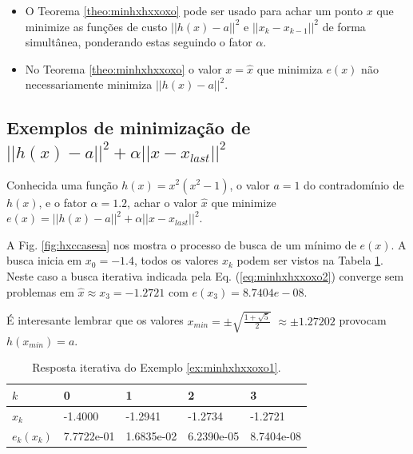 \begin{tcbattention}
\begin{itemize}
\item O Teorema \ref{theo:minhxhxxoxo} pode ser usado para achar um ponto $x$
que minimize as funções de custo $||h(x)-a||^2$ e
 $||x_{k}-x_{k-1}||^2$ de forma simultânea, ponderando estas seguindo o fator $\alpha$.
\item No Teorema \ref{theo:minhxhxxoxo} o valor $x=\hat{x}$ 
que minimiza $e(x)$ não necessariamente minimiza $||h(x)-a||^2$.
\end{itemize}
\end{tcbattention}
\subsection{Exemplos de minimização de $||h(x)-a||^2+\alpha ||x-x_{last}||^2$}


\begin{example}\label{ex:minhxhxxoxo1}
Conhecida uma função $h(x)=x^2(x^2-1)$, o valor $a=1$ do contradomínio de $h(x)$,
e o fator $\alpha=1.2$,
achar o valor $\hat{x}$ que minimize $e(x)=||h(x)-a||^2+\alpha||x-x_{last}||^2$.
\end{example}
\begin{SolutionT}\label{sol:minhxhxxoxo1}
 A Fig. \ref{fig:hxccasesa} nos mostra o processo de busca de um mínimo
 de $e(x)$. A busca inicia em $x_0=-1.4$,
 todos os valores $x_{k}$ podem ser vistos na Tabela \ref{tab:hxccases1}. 
Neste caso a busca iterativa indicada pela Eq. (\ref{eq:minhxhxxoxo2}) converge sem problemas 
em $\hat{x}\approx x_3 =-1.2721$ com $e(x_3)=8.7404e-08$.

É interesante lembrar que os valores $x_{min}=\pm \sqrt{\frac{1+\sqrt{5}}{2}}$ 
$\approx \pm 1.27202$ provocam $h(x_{min})=a$.
\end{SolutionT}

\begin{table}[!h]
\centering
\begin{tabular}{|l|l|l|l|l|}
\hline
$k$      & 0 & 1 & 2 & 3 \\ \hline
$x_k$    & -1.4000 & -1.2941 & -1.2734 & -1.2721 \\ \hline
$e_k(x_k)$ & 7.7722e-01 & 1.6835e-02 & 6.2390e-05 & 8.7404e-08 \\ \hline
\end{tabular}
\caption{Resposta iterativa do Exemplo \ref{ex:minhxhxxoxo1}.}
\label{tab:hxccases1}
\end{table}

